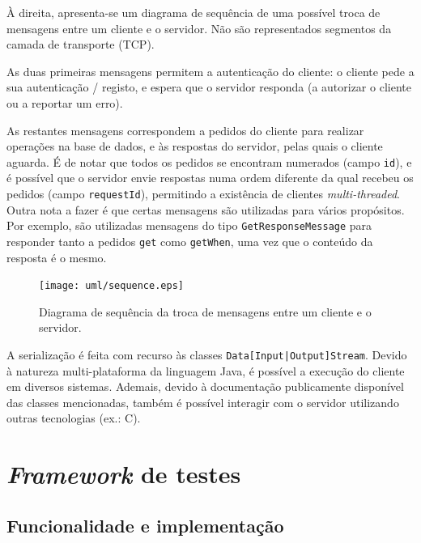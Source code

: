 \documentclass[11pt, a4paper]{article}
\begin{document}
\begin{minipage}{0.5\textwidth}
    \setlength{\parskip}{\baselineskip}
    \setlength{\parindent}{0pt}

    À direita, apresenta-se um diagrama de sequência de uma possível troca de mensagens entre um
    cliente e o servidor. Não são representados segmentos da camada de transporte (TCP).

    As duas primeiras mensagens permitem a autenticação do cliente: o cliente pede a sua
    autenticação / registo, e espera que o servidor responda (a autorizar o cliente ou a reportar um
    erro).

    As restantes mensagens correspondem a pedidos do cliente para realizar operações na base de
    dados, e às respostas do servidor, pelas quais o cliente aguarda. É de notar que todos os
    pedidos se encontram numerados (campo \texttt{id}), e é possível que o servidor envie respostas
    numa ordem diferente da qual recebeu os pedidos (campo \texttt{requestId}), permitindo a
    existência de clientes \emph{multi-threaded}. Outra nota a fazer é que certas mensagens são
    utilizadas para vários propósitos. Por exemplo, são utilizadas mensagens do tipo
    \texttt{GetResponseMessage} para responder tanto a pedidos \texttt{get} como \texttt{getWhen},
    uma vez que o conteúdo da resposta é o mesmo.
\end{minipage}
\hspace{0.03\textwidth}
\begin{minipage}{0.47\textwidth}
    \begin{figure}[H]
        \centering
        \texttt{[image: uml/sequence.eps]}
        \caption{Diagrama de sequência da troca de mensagens entre um cliente e o servidor.}
        \label{sequence}
    \end{figure}
\end{minipage}

A serialização é feita com recurso às classes \texttt{Data[Input|Output]Stream}. Devido à natureza
multi-plataforma da linguagem Java, é possível a execução do cliente em diversos sistemas. Ademais,
devido à documentação publicamente disponível das classes mencionadas, também é possível interagir
com o servidor utilizando outras tecnologias (ex.: C).

\section{\emph{Framework} de testes}

\subsection{Funcionalidade e implementação}
\end{document}
